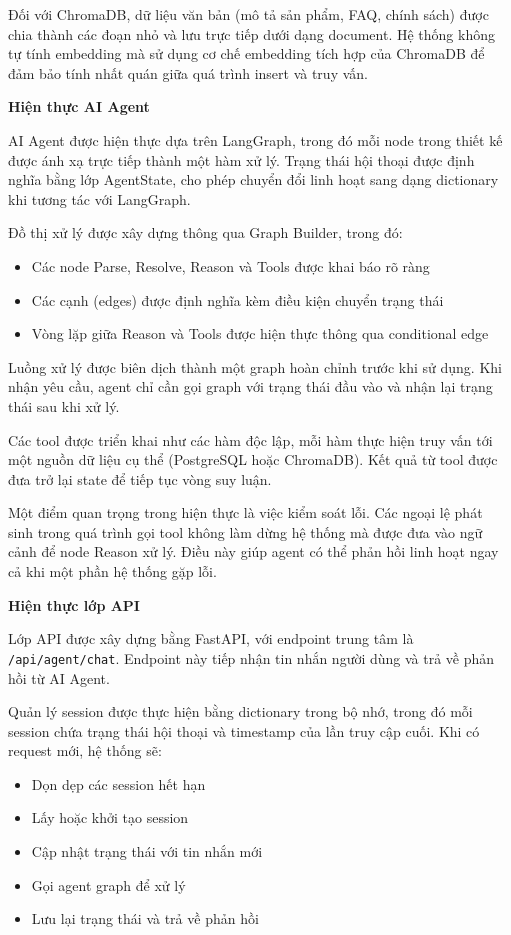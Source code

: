 Đối với ChromaDB, dữ liệu văn bản (mô tả sản phẩm, FAQ, chính sách) được chia thành các đoạn nhỏ và lưu trực tiếp dưới dạng document. Hệ thống không tự tính embedding mà sử dụng cơ chế embedding tích hợp của ChromaDB để đảm bảo tính nhất quán giữa quá trình insert và truy vấn.

\textbf{Hiện thực AI Agent}

AI Agent được hiện thực dựa trên LangGraph, trong đó mỗi node trong thiết kế được ánh xạ trực tiếp thành một hàm xử lý. Trạng thái hội thoại được định nghĩa bằng lớp AgentState, cho phép chuyển đổi linh hoạt sang dạng dictionary khi tương tác với LangGraph.

Đồ thị xử lý được xây dựng thông qua Graph Builder, trong đó:

\begin{itemize}
\item Các node Parse, Resolve, Reason và Tools được khai báo rõ ràng
\item Các cạnh (edges) được định nghĩa kèm điều kiện chuyển trạng thái
\item Vòng lặp giữa Reason và Tools được hiện thực thông qua conditional edge
\end{itemize}

Luồng xử lý được biên dịch thành một graph hoàn chỉnh trước khi sử dụng. Khi nhận yêu cầu, agent chỉ cần gọi graph với trạng thái đầu vào và nhận lại trạng thái sau khi xử lý.

Các tool được triển khai như các hàm độc lập, mỗi hàm thực hiện truy vấn tới một nguồn dữ liệu cụ thể (PostgreSQL hoặc ChromaDB). Kết quả từ tool được đưa trở lại state để tiếp tục vòng suy luận.

Một điểm quan trọng trong hiện thực là việc kiểm soát lỗi. Các ngoại lệ phát sinh trong quá trình gọi tool không làm dừng hệ thống mà được đưa vào ngữ cảnh để node Reason xử lý. Điều này giúp agent có thể phản hồi linh hoạt ngay cả khi một phần hệ thống gặp lỗi.

\textbf{Hiện thực lớp API}

Lớp API được xây dựng bằng FastAPI, với endpoint trung tâm là \texttt{/api/agent/chat}. Endpoint này tiếp nhận tin nhắn người dùng và trả về phản hồi từ AI Agent.

Quản lý session được thực hiện bằng dictionary trong bộ nhớ, trong đó mỗi session chứa trạng thái hội thoại và timestamp của lần truy cập cuối. Khi có request mới, hệ thống sẽ:

\begin{itemize}
\item Dọn dẹp các session hết hạn
\item Lấy hoặc khởi tạo session
\item Cập nhật trạng thái với tin nhắn mới
\item Gọi agent graph để xử lý
\item Lưu lại trạng thái và trả về phản hồi
\end{itemize}

